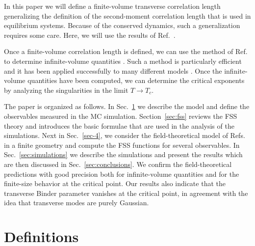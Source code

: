 \documentclass[12pt]{article}
\begin{document}
In this paper we will define a finite-volume transverse correlation length
generalizing the definition of the second-moment correlation length that is 
used in equilibrium systems. Because of the conserved dynamics, such a 
generalization requires some care. Here, we will use the results of 
Ref.~\cite{correlation_length}.

Once a finite-volume correlation length is defined, we can use the method of 
Ref. \cite{Caracciolo95} to determine infinite-volume quantities \cite{foot3}.
Such a method is particularly efficient and it has been applied successfully 
to many different models 
\cite{Caracciolo95b,Caracciolo:1996ah,Mana-etal-96,Mendes-etal-96,Mana-etal-97,Ferreira-Sokal-99,Palassini-Caracciolo-99}. Once the infinite-volume 
quantities have been computed, we can determine the critical exponents 
by analyzing the singularities in the limit $T \to T_c$.

The paper is organized as follows.
In Sec.~\ref{sec-2} we describe the model and define the
observables measured in the MC simulation.
Section~\ref{sec:fss} reviews the FSS theory and introduces the 
basic formulae that are used in the analysis
of  the simulations.  Next in Sec.~\ref{sec-4}, we consider the 
field-theoretical model of
Refs.~\cite{Janssen86a,Leung86} in a finite 
geometry and compute the
FSS functions for several observables. 
In Sec.~\ref{sec:simulations} we describe the
simulations and present the results which are then discussed in
Sec.~\ref{sec:conclusions}. 
We confirm the field-theoretical predictions with good precision 
both for infinite-volume quantities and for the finite-size behavior 
at the critical
point. Our results also indicate that the 
transverse Binder parameter vanishes at the critical point, in 
agreement with the idea that transverse modes are purely Gaussian.

\section{Definitions}
\label{sec-2}
\end{document}
